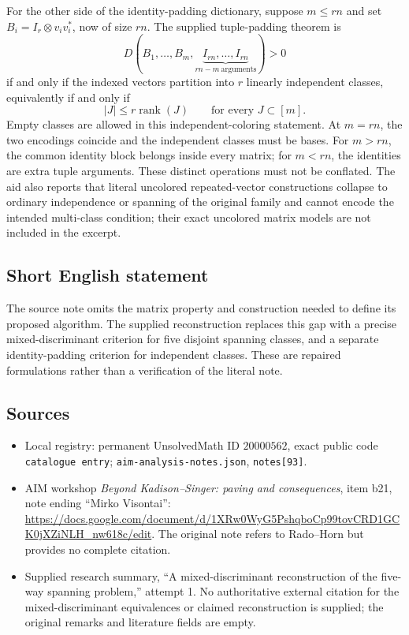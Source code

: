\documentclass[11pt]{article}
\begin{document}
For the other side of the identity-padding dictionary, suppose \(m\leq rn\) and set \(B_i=I_r\otimes v_iv_i^*\), now of size \(rn\). The supplied tuple-padding theorem is
\[
 D(B_1,\ldots,B_m,\underbrace{I_{rn},\ldots,I_{rn}}_{rn-m\ \mathrm{arguments}})>0
\]
if and only if the indexed vectors partition into \(r\) linearly independent classes, equivalently if and only if
\[
 |J|\leq r\operatorname{rank}(J)\qquad\text{for every }J\subset[m].
\]
Empty classes are allowed in this independent-coloring statement. At \(m=rn\), the two encodings coincide and the independent classes must be bases. For \(m>rn\), the common identity block belongs inside every matrix; for \(m<rn\), the identities are extra tuple arguments. These distinct operations must not be conflated. The aid also reports that literal uncolored repeated-vector constructions collapse to ordinary independence or spanning of the original family and cannot encode the intended multi-class condition; their exact uncolored matrix models are not included in the excerpt.
\subsection{Short English statement}
The source note omits the matrix property and construction needed to define its proposed algorithm. The supplied reconstruction replaces this gap with a precise mixed-discriminant criterion for five disjoint spanning classes, and a separate identity-padding criterion for independent classes. These are repaired formulations rather than a verification of the literal note.
\subsection{Sources}
\begin{itemize}
\item Local registry: permanent UnsolvedMath ID \(20000562\), exact public code \texttt{catalogue entry}; \texttt{aim-analysis-notes.json}, \texttt{notes[93]}.
\item AIM workshop \emph{Beyond Kadison--Singer: paving and consequences}, item b21, note ending ``Mirko Visontai'': \url{https://docs.google.com/document/d/1XRw0WyG5PshqboCp99tovCRD1GCK0jXZiNLH_nw618c/edit}. The original note refers to Rado--Horn but provides no complete citation.
\item Supplied research summary, ``A mixed-discriminant reconstruction of the five-way spanning problem,'' attempt 1. No authoritative external citation for the mixed-discriminant equivalences or claimed reconstruction is supplied; the original remarks and literature fields are empty.
\end{itemize}
\end{document}
